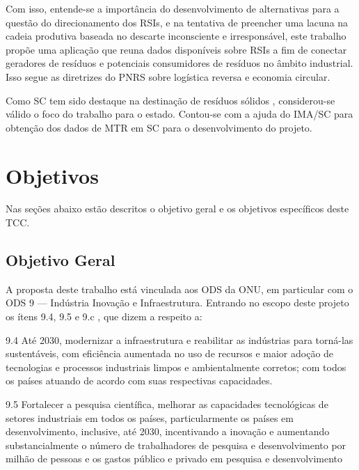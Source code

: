 Com isso, entende-se a importância do desenvolvimento de alternativas para a questão do direcionamento dos \gls{RSI}s, e na tentativa de preencher uma lacuna na cadeia produtiva baseada no descarte inconsciente e irresponsável, este trabalho propõe uma aplicação que reuna dados disponíveis sobre \gls{RSI}s a fim de conectar geradores de resíduos e potenciais consumidores de resíduos no âmbito industrial. Isso segue as diretrizes do \gls{PNRS} sobre logística reversa e economia circular. 

Como \gls{SC} tem sido destaque na destinação de resíduos sólidos \cite{crea_sc_destino_2013}, considerou-se válido o foco do trabalho para o estado. Contou-se com a ajuda do \gls{IMA/SC} para obtenção dos dados de \gls{MTR} em \gls{SC} para o desenvolvimento do projeto.

\section{Objetivos}

Nas seções abaixo estão descritos o objetivo geral e os objetivos específicos deste TCC.

\subsection{Objetivo Geral}

A proposta deste trabalho está vinculada aos \gls{ODS} da \gls{ONU}, em particular com o \gls{ODS} 9 — Indústria Inovação e Infraestrutura. Entrando no escopo deste projeto os ítens 9.4, 9.5 e 9.c \cite{noauthor_sustainable_nodate}, que dizem a respeito a:

\begin{citacao}
	9.4 Até 2030, modernizar a infraestrutura e reabilitar as indústrias para torná-las sustentáveis, com eficiência aumentada no uso de recursos e maior adoção de tecnologias e processos industriais limpos e ambientalmente corretos; com todos os países atuando de acordo com suas respectivas capacidades.
\end{citacao}

\begin{citacao}
	9.5 Fortalecer a pesquisa científica, melhorar as capacidades tecnológicas de setores industriais em todos os países, particularmente os países em desenvolvimento, inclusive, até 2030, incentivando a inovação e aumentando substancialmente o número de trabalhadores de pesquisa e desenvolvimento por milhão de pessoas e os gastos público e privado em pesquisa e desenvolvimento
\end{citacao}


